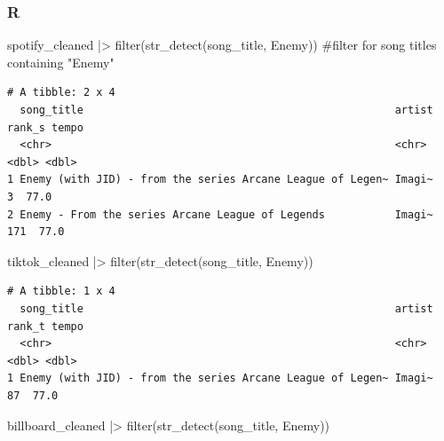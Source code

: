 \documentclass[
  letterpaper,
  DIV=11,
  numbers=noendperiod]{scrreprt}
\newenvironment{Shaded}{\begin{snugshade}}{\end{snugshade}}
\newcommand{\CommentTok}[1]{\textcolor[rgb]{0.37,0.37,0.37}{#1}}
\newcommand{\FunctionTok}[1]{\textcolor[rgb]{0.28,0.35,0.67}{#1}}
\newcommand{\NormalTok}[1]{\textcolor[rgb]{0.00,0.23,0.31}{#1}}
\newcommand{\SpecialCharTok}[1]{\textcolor[rgb]{0.37,0.37,0.37}{#1}}
\newcommand{\StringTok}[1]{\textcolor[rgb]{0.13,0.47,0.30}{#1}}
\begin{document}
\subsubsection{R}

\begin{Shaded}
\begin{Highlighting}[]
\NormalTok{spotify\_cleaned }\SpecialCharTok{|\textgreater{}}
  \FunctionTok{filter}\NormalTok{(}\FunctionTok{str\_detect}\NormalTok{(song\_title, }\StringTok{\textquotesingle{}Enemy\textquotesingle{}}\NormalTok{)) }\CommentTok{\#filter for song titles containing "Enemy"}
\end{Highlighting}
\end{Shaded}

\begin{verbatim}
# A tibble: 2 x 4
  song_title                                                 artist rank_s tempo
  <chr>                                                      <chr>   <dbl> <dbl>
1 Enemy (with JID) - from the series Arcane League of Legen~ Imagi~      3  77.0
2 Enemy - From the series Arcane League of Legends           Imagi~    171  77.0
\end{verbatim}

\begin{Shaded}
\begin{Highlighting}[]
\NormalTok{tiktok\_cleaned }\SpecialCharTok{|\textgreater{}}
  \FunctionTok{filter}\NormalTok{(}\FunctionTok{str\_detect}\NormalTok{(song\_title, }\StringTok{\textquotesingle{}Enemy\textquotesingle{}}\NormalTok{))}
\end{Highlighting}
\end{Shaded}

\begin{verbatim}
# A tibble: 1 x 4
  song_title                                                 artist rank_t tempo
  <chr>                                                      <chr>   <dbl> <dbl>
1 Enemy (with JID) - from the series Arcane League of Legen~ Imagi~     87  77.0
\end{verbatim}

\begin{Shaded}
\begin{Highlighting}[]
\NormalTok{billboard\_cleaned }\SpecialCharTok{|\textgreater{}}
  \FunctionTok{filter}\NormalTok{(}\FunctionTok{str\_detect}\NormalTok{(song\_title, }\StringTok{\textquotesingle{}Enemy\textquotesingle{}}\NormalTok{))}
\end{Highlighting}
\end{Shaded}
\end{document}
